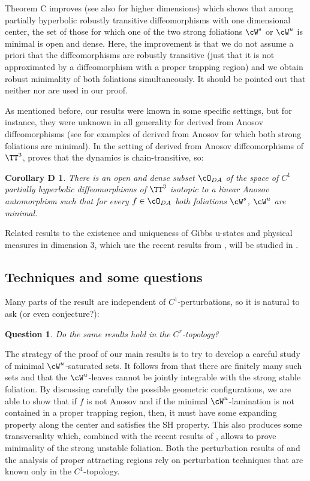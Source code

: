 \documentclass[a4paper,11pt]{amsart}
\numberwithin{equation}{section}     %
\newtheorem{quest}{Question}
\newtheorem*{corD}{Corollary D}
\theoremstyle{definition}
\theoremstyle{remark}
\begin{document}
Theorem C improves \cite{BDU} (see also \cite{HHU} for higher dimensions) which shows that among partially hyperbolic robustly transitive diffeomorphisms with one dimensional center, the set of those for which one of the two strong foliations $\cW^s$ or $\cW^u$ is minimal is open and dense. 
Here, the improvement is that we do not assume a priori that the diffeomorphisms are robustly transitive (just that it is not approximated by a diffeomorphism with a proper trapping region) and we obtain robust minimality of both foliations simultaneously. It should be pointed out that neither \cite{BDU} nor \cite{HHU} are used in our proof.

As mentioned before, our results were known in some specific settings, but for instance, they were unknown in all generality for derived from Anosov diffeomorphisms (see \cite{HUY} for examples of derived from Anosov for which both strong foliations are minimal). 
In the setting of derived from Anosov diffeomorphisms of $\TT^3$, \cite{CPo} proves that
the dynamics is chain-transitive, so:

\begin{corD}
There is an open and dense subset $\cO_{DA}$ of the space of $C^1$ partially hyperbolic diffeomorphisms of $\TT^3$ isotopic to a linear Anosov automorphism such that for every $f \in \cO_{DA}$ both foliations $\cW^s$, $\cW^u$ are minimal. 
\end{corD}

Related results to the existence and uniqueness of Gibbs u-states and physical measures in dimension 3, which use the recent results from \cite{Katz,ALOS,EPZ}, will be studied in \cite{ACEPWZ}. 

\subsection{Techniques and some questions} 

Many parts of the result are independent of $C^1$-perturbations, so it is natural to ask (or even conjecture?):

\begin{quest} 
Do the same results hold in the $C^r$-topology? 
\end{quest}

The strategy of the proof of our main results is to try to develop a careful study of minimal $\cW^u$-saturated sets. It follows from \cite{CPoS} that there are finitely many such sets and that the $\cW^u$-leaves cannot be jointly integrable with the strong stable foliation.
By discussing carefully the possible geometric configurations, we are able to show that if
$f$ is not Anosov and if the minimal $\cW^u$-lamination is not contained in a proper trapping region, then, it must have some expanding property along the center and satisfies the SH property. This also produces some transversality which, combined with the recent results of \cite{ACW}, allows to prove minimality of the strong unstable foliation. Both the perturbation results of \cite{CPoS} and the analysis of proper attracting regions rely on perturbation techniques that are known only in the $C^1$-topology. 
\end{document}
